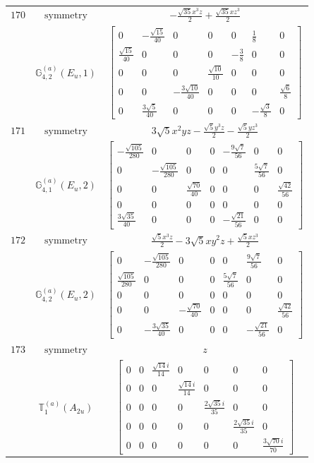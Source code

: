 \documentclass[fleqn,8pt,landscape]{jsarticle}
\begin{document}
\begin{longtable}{ccc}
$ 170 $ & $ \text{symmetry} $ & $ - \frac{\sqrt{35} x^{3} z}{2} + \frac{\sqrt{35} x z^{3}}{2} $ \\
$  $ & $ \mathbb{G}_{4,2}^{(a)}(E_{u},1) $ & $ \begin{bmatrix} 0 & - \frac{\sqrt{15}}{40} & 0 & 0 & 0 & \frac{1}{8} & 0 \\ \frac{\sqrt{15}}{40} & 0 & 0 & 0 & - \frac{3}{8} & 0 & 0 \\ 0 & 0 & 0 & \frac{\sqrt{10}}{10} & 0 & 0 & 0 \\ 0 & 0 & - \frac{3 \sqrt{10}}{40} & 0 & 0 & 0 & \frac{\sqrt{6}}{8} \\ 0 & \frac{3 \sqrt{5}}{40} & 0 & 0 & 0 & - \frac{\sqrt{3}}{8} & 0 \end{bmatrix} $ \\ \hline
$ 171 $ & $ \text{symmetry} $ & $ 3 \sqrt{5} x^{2} y z - \frac{\sqrt{5} y^{3} z}{2} - \frac{\sqrt{5} y z^{3}}{2} $ \\
$  $ & $ \mathbb{G}_{4,1}^{(a)}(E_{u},2) $ & $ \begin{bmatrix} - \frac{\sqrt{105}}{280} & 0 & 0 & 0 & - \frac{9 \sqrt{7}}{56} & 0 & 0 \\ 0 & - \frac{\sqrt{105}}{280} & 0 & 0 & 0 & \frac{5 \sqrt{7}}{56} & 0 \\ 0 & 0 & \frac{\sqrt{70}}{40} & 0 & 0 & 0 & \frac{\sqrt{42}}{56} \\ 0 & 0 & 0 & 0 & 0 & 0 & 0 \\ \frac{3 \sqrt{35}}{40} & 0 & 0 & 0 & - \frac{\sqrt{21}}{56} & 0 & 0 \end{bmatrix} $ \\ \hline
$ 172 $ & $ \text{symmetry} $ & $ \frac{\sqrt{5} x^{3} z}{2} - 3 \sqrt{5} x y^{2} z + \frac{\sqrt{5} x z^{3}}{2} $ \\
$  $ & $ \mathbb{G}_{4,2}^{(a)}(E_{u},2) $ & $ \begin{bmatrix} 0 & - \frac{\sqrt{105}}{280} & 0 & 0 & 0 & \frac{9 \sqrt{7}}{56} & 0 \\ \frac{\sqrt{105}}{280} & 0 & 0 & 0 & \frac{5 \sqrt{7}}{56} & 0 & 0 \\ 0 & 0 & 0 & 0 & 0 & 0 & 0 \\ 0 & 0 & - \frac{\sqrt{70}}{40} & 0 & 0 & 0 & \frac{\sqrt{42}}{56} \\ 0 & - \frac{3 \sqrt{35}}{40} & 0 & 0 & 0 & - \frac{\sqrt{21}}{56} & 0 \end{bmatrix} $ \\ \hline
$ 173 $ & $ \text{symmetry} $ & $ z $ \\
$  $ & $ \mathbb{T}_{1}^{(a)}(A_{2u}) $ & $ \begin{bmatrix} 0 & 0 & \frac{\sqrt{14} i}{14} & 0 & 0 & 0 & 0 \\ 0 & 0 & 0 & \frac{\sqrt{14} i}{14} & 0 & 0 & 0 \\ 0 & 0 & 0 & 0 & \frac{2 \sqrt{35} i}{35} & 0 & 0 \\ 0 & 0 & 0 & 0 & 0 & \frac{2 \sqrt{35} i}{35} & 0 \\ 0 & 0 & 0 & 0 & 0 & 0 & \frac{3 \sqrt{70} i}{70} \end{bmatrix} $ \\ \hline

\end{longtable}
\end{document}
